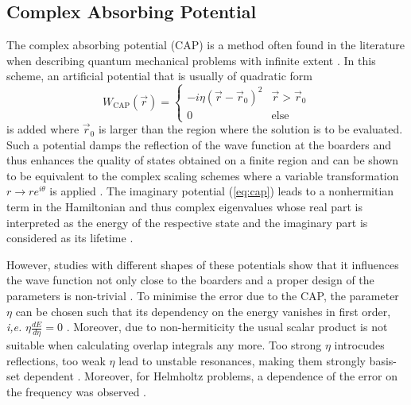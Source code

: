 \subsection{Complex Absorbing Potential}
\label{ch:cap}
The complex absorbing potential (CAP) is a method often found in the literature when describing quantum  mechanical problems with infinite extent \cite{bauch1, bauch2,capWork}.
In this scheme, an artificial potential that is usually of quadratic form
\begin{equation} \label{eq:cap}
   W_\text{CAP}(\vec{r})=\begin{cases} -i\eta(\vec{r}-\vec{r}_0)^2 & \vec{r}>\vec{r}_0 \\
                                           0    & \text{else} \end{cases}
\end{equation}
is added where $\vec{r}_0$ is larger than the region where the solution is to be evaluated.
Such a potential damps the reflection of the wave function at the boarders and thus enhances the quality of states obtained on a finite region \cite{cap1, cap2} and can be shown to be equivalent to the complex scaling schemes where a variable transformation \cite{compScale} $r\rightarrow re^{i\theta}$ is applied \cite{cap2,capWork}.
The imaginary potential (\ref{eq:cap}) leads to a nonhermitian term in the Hamiltonian and thus complex eigenvalues whose real part is interpreted as the energy of the respective state and the imaginary part is considered as its lifetime \cite{compScale}.

However, studies with different shapes of these potentials show that it influences the wave function not only close to the boarders and a proper design of the parameters is non-trivial \cite{CAPfreshlook}.
To minimise the error due to the CAP, the parameter $\eta$ can be chosen such that its dependency on the energy vanishes in first order, \textit{i,e.} $\eta\frac{dE}{d\eta}=0$ \cite{CAPccEOM,CAPfreshlook}.
Moreover, due to non-hermiticity the usual scalar product is not suitable when calculating overlap integrals any more.
Too strong $\eta$ introcudes reflections, too weak $\eta$ lead to unstable resonances, making them strongly basis-set dependent \cite{CAPfreshlook}.
Moreover, for Helmholtz problems, a dependence of the error on the frequency was observed \cite{babuska}.


